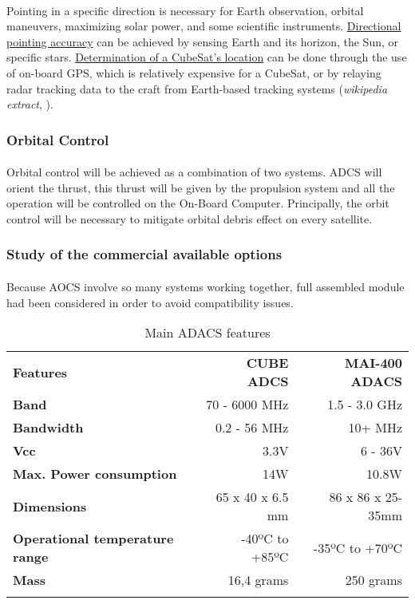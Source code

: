 \paragraph{} Pointing in a specific direction is necessary for Earth observation, orbital maneuvers, maximizing solar power, and some scientific instruments. \underline{Directional pointing accuracy} can be achieved by sensing Earth and its horizon, the Sun, or specific stars. \underline{Determination of a CubeSat's location} can be done through the use of on-board GPS, which is relatively expensive for a CubeSat, or by relaying radar tracking data to the craft from Earth-based tracking systems (\textit{wikipedia extract}, \cite{Macdonald2014}).
\subsubsection{Orbital Control}
\paragraph{} Orbital control will be achieved as a combination of two systems. ADCS will orient the thrust, this thrust will be given by the propulsion system and all the operation will be controlled on the On-Board Computer. Principally, the orbit control will be necessary to mitigate orbital debris effect on every satellite.
\subsubsection{Study of the commercial available options}
\paragraph{} Because AOCS involve so many systems working together, full assembled module had been considered in order to avoid compatibility issues. 
\begin{longtable}{| l | r | r |}
	
	\hline
	\rowcolor[gray]{0.60} \multicolumn{3}{|c|}{\textbf{ADACS options }} \\
	\hline
	
	\hline
	\rowcolor[gray]{0.75}	\textbf{Features} &  \textbf{CUBE ADCS} & \textbf{MAI-400 ADACS} \\
	\hline
	
	\cellcolor[gray]{0.85} \textbf{Band} & 70 - 6000 MHz  & 1.5 - 3.0 GHz\\
	\cellcolor[gray]{0.85} \textbf{Bandwidth} & 0.2 - 56 MHz& 10+ MHz\\
	\cellcolor[gray]{0.85} \textbf{Vcc} & 3.3V&6 - 36V \\
	\cellcolor[gray]{0.85} \textbf{Max. Power consumption} & 14W& 10.8W\\
	\cellcolor[gray]{0.85} \textbf{Dimensions} & 65 x 40 x 6.5 mm & 86 x 86 x 25-35mm\\
	\cellcolor[gray]{0.85} \textbf{Operational temperature range} & -40ºC to +85ºC & -35ºC to +70ºC\\
	\cellcolor[gray]{0.85} \textbf{Mass} & 16,4 grams&250 grams \\
	\hline
	
	\caption{Main ADACS features}
	\label{ADACS}
	
\end{longtable}